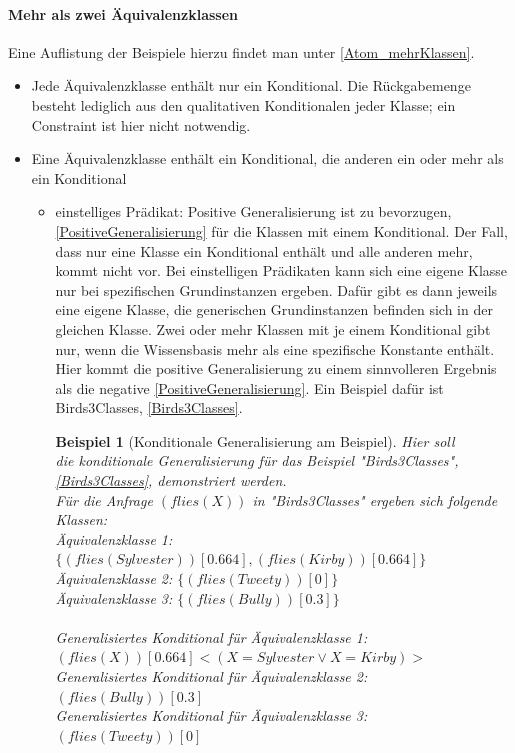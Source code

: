 \documentclass[draft]{scrreprt}
\newtheorem{Bsp}{Beispiel}[section]
\begin{document}
\paragraph{ Mehr als zwei Äquivalenzklassen} 
Eine Auflistung der Beispiele hierzu findet man unter \ref{Atom_mehrKlassen}.\\
\begin{itemize}
	\item Jede Äquivalenzklasse enthält nur ein Konditional. Die Rückgabemenge besteht lediglich aus den qualitativen Konditionalen jeder Klasse; ein Constraint ist hier nicht notwendig.
	\item Eine Äquivalenzklasse enthält ein Konditional, die anderen ein oder mehr als ein Konditional
	\begin{itemize}
		\item einstelliges Prädikat: Positive Generalisierung ist zu bevorzugen, \ref{PositiveGeneralisierung} für die Klassen mit einem Konditional. Der Fall, dass nur eine Klasse ein Konditional enthält und alle anderen mehr, kommt nicht vor. Bei einstelligen Prädikaten kann sich eine eigene Klasse nur bei spezifischen Grundinstanzen ergeben. Dafür gibt es dann jeweils eine eigene Klasse, die generischen Grundinstanzen befinden sich in der gleichen Klasse. Zwei oder mehr Klassen mit je einem Konditional gibt nur, wenn die Wissensbasis mehr als eine spezifische Konstante enthält. Hier kommt die positive Generalisierung zu einem sinnvolleren Ergebnis als die negative \ref{PositiveGeneralisierung}. Ein Beispiel dafür ist Birds3Classes, \ref{Birds3Classes}.\\
		\begin{Bsp}[Konditionale Generalisierung am Beispiel]
		Hier soll \\ die konditionale Generalisierung für das Beispiel "{}Birds3Classes"{}, \ref{Birds3Classes}, demonstriert werden.\\
		Für die Anfrage $ (flies(X)) $ in "{}Birds3Classes"{} ergeben sich folgende Klassen:\\
		
		\noindent
		Äquivalenzklasse 1: $ \{(flies(Sylvester))[0.664], (flies(Kirby))[0.664]\}  $\\
		Äquivalenzklasse 2: $ \{(flies(Tweety))[0]\} $\\
		Äquivalenzklasse 3: $ \{(flies(Bully))[0.3]\} $\\
		\\
		Generalisiertes Konditional für Äquivalenzklasse 1:\\ $ (flies(X))[0.664]<(X = Sylvester \lor  X = Kirby)>$\\
		Generalisiertes Konditional für Äquivalenzklasse 2:\\ $ (flies(Bully))[0.3] $\\
		Generalisiertes Konditional für Äquivalenzklasse 3:\\ $ (flies(Tweety))[0] $\\
	

\end{Bsp}
\end{itemize}
\end{itemize}
\end{document}

